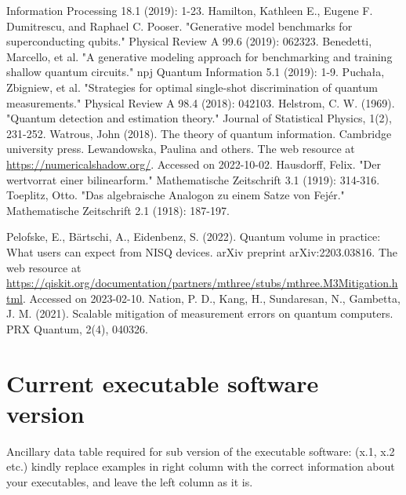 \documentclass[preprint,12pt, a4paper, dvipsnames]{elsarticle}
\newcommand{\1}{{\rm 1\hspace{-0.9mm}l}}
\begin{document}
\begin{thebibliography}{00}
Information Processing 18.1 (2019): 1-23.
 Hamilton, Kathleen E., Eugene F. Dumitrescu,
and Raphael C. Pooser. "Generative model benchmarks for superconducting
qubits." Physical Review A 99.6 (2019): 062323.
 Benedetti, Marcello, et al. "A generative
modeling approach for benchmarking and training shallow quantum circuits." npj
Quantum Information 5.1 (2019): 1-9.
 Puchała, Zbigniew, et al. "Strategies for
optimal single-shot discrimination of quantum measurements." Physical Review A
98.4 (2018): 042103.
 Helstrom, C. W. (1969). "Quantum detection and estimation theory." Journal of Statistical Physics, 1(2), 231-252.
 Watrous, John (2018). The theory of quantum information. Cambridge university press.
 Lewandowska, Paulina and others. The web resource at \url{https://numericalshadow.org/}. Accessed on 2022-10-02.
 Hausdorff, Felix. "Der wertvorrat einer bilinearform." Mathematische Zeitschrift 3.1 (1919): 314-316.
 Toeplitz, Otto. "Das algebraische Analogon zu einem Satze von Fejér." Mathematische Zeitschrift 2.1 (1918): 187-197.

 Pelofske, E., B{\"a}rtschi, A., Eidenbenz, S. (2022). Quantum volume in practice: What users can expect from NISQ devices. arXiv preprint arXiv:2203.03816.
 The web resource at \url{https://qiskit.org/documentation/partners/mthree/stubs/mthree.M3Mitigation.html}. Accessed on 2023-02-10.
 Nation, P. D., Kang, H., Sundaresan, N.,  Gambetta, J. M. (2021). Scalable mitigation of measurement errors on quantum computers. PRX Quantum, 2(4), 040326.
\end{thebibliography}



\section*{Current executable software version}
\label{}

Ancillary data table required for sub version of the executable software: (x.1,
x.2 etc.) kindly replace examples in right column with the correct information
about your executables, and leave the left column as it is.
\end{document}
